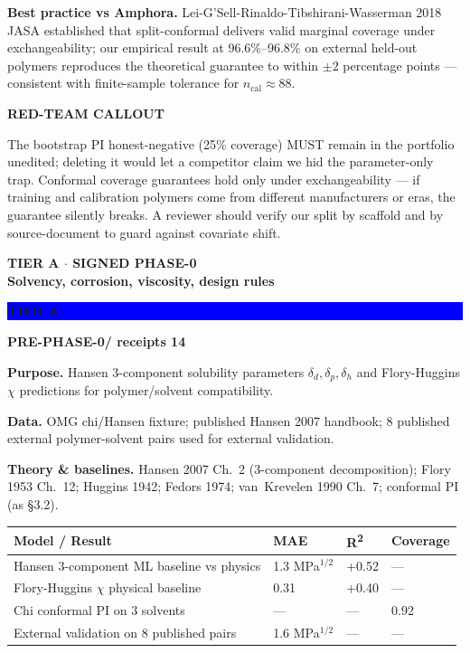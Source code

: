 \documentclass[10pt,a4paper]{article}
\newcommand{\PageTitle}[2]{%
  {\sffamily\fontsize{7.5}{9}\selectfont\bfseries\color{Cyan}\MakeUppercase{#1}}\\[-1pt]
  {\sffamily\fontsize{20}{22}\selectfont\bfseries\color{Navy}#2}\par\vspace{3mm}}
\newcommand{\redteambox}[1]{%
  \begin{tcolorbox}[enhanced,breakable,colback=PaleRed,colframe=Red,boxrule=.4pt,arc=1.5mm,left=2.8mm,right=2.8mm,top=1.6mm,bottom=1.6mm]
  {\sffamily\fontsize{6.8}{8}\selectfont\bfseries\color{Red}\MakeUppercase{Red-team callout}}\par
  \fontsize{8.4}{10}\selectfont #1
  \end{tcolorbox}}
\newcommand{\prephase}{\textcolor{Amber}{\bfseries PRE-PHASE-0}}
\newcommand{\code}[1]{{\ttfamily\fontsize{7.2}{8.4}\selectfont\detokenize{#1}}}
\newcommand{\ModuleHeader}[4]{%
  \vspace{1mm}
  \noindent\begin{minipage}{\linewidth}
    \colorbox{#2}{\parbox[c][5.6mm][c]{16mm}{\centering\sffamily\bfseries\color{white} TIER #1}}%
    \hspace{2mm}{\sffamily\bfseries\large\color{Navy}\code{#3}}%
    \hfill{\sffamily\bfseries\color{Muted} #4}%
  \end{minipage}\par\vspace{0.5mm}}
\begin{document}
\textbf{Best practice vs Amphora.} Lei-G'Sell-Rinaldo-Tibshirani-Wasserman 2018 JASA established that split-conformal delivers valid marginal coverage under exchangeability; our empirical result at 96.6\%--96.8\% on external held-out polymers reproduces the theoretical guarantee to within \(\pm 2\) percentage points --- consistent with finite-sample tolerance for \(n_{\text{cal}} \approx 88\).

\redteambox{The bootstrap PI honest-negative (25\% coverage) MUST remain in the portfolio unedited; deleting it would let a competitor claim we hid the parameter-only trap. Conformal coverage guarantees hold only under exchangeability --- if training and calibration polymers come from different manufacturers or eras, the guarantee silently breaks. A reviewer should verify our split by scaffold and by source-document to guard against covariate shift.}

\newpage

\PageTitle{Tier A \(\cdot\) Signed Phase-0}{Solvency, corrosion, viscosity, design rules}

\ModuleHeader{A}{Blue}{amphora-solvency-score}{\prephase / receipts 14}

\textbf{Purpose.} Hansen 3-component solubility parameters \(\delta_d, \delta_p, \delta_h\) and Flory-Huggins \(\chi\) predictions for polymer/solvent compatibility.

\textbf{Data.} OMG chi/Hansen fixture; published Hansen 2007 handbook; 8 published external polymer-solvent pairs used for external validation.

\textbf{Theory \& baselines.} Hansen 2007 Ch.~2 (3-component decomposition); Flory 1953 Ch.~12; Huggins 1942; Fedors 1974; van~Krevelen 1990 Ch.~7; conformal PI (as \S3.2).

\begin{center}\footnotesize
\begin{tabular}{@{}L{50mm} R{18mm} R{16mm} R{16mm}@{}}
\toprule
\textbf{Model / Result} & \textbf{MAE} & \textbf{R\textsuperscript{2}} & \textbf{Coverage} \\
\midrule
Hansen 3-component ML baseline vs physics & 1.3 MPa\(^{1/2}\) & +0.52 & --- \\
Flory-Huggins \(\chi\) physical baseline & 0.31 & +0.40 & --- \\
Chi conformal PI on 3 solvents & --- & --- & 0.92 \\
External validation on 8 published pairs & 1.6 MPa\(^{1/2}\) & --- & --- \\
\bottomrule
\end{tabular}\end{center}
\end{document}
